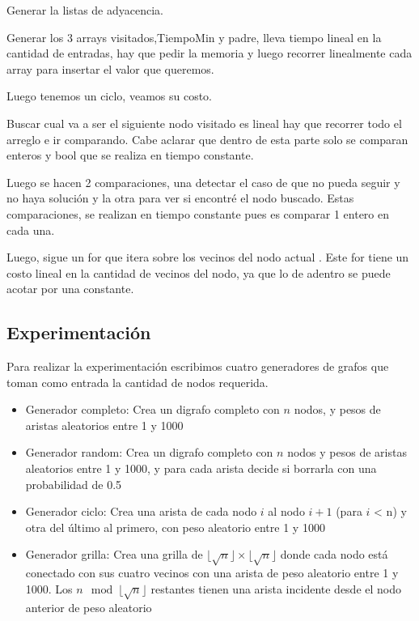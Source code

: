 Generar la listas de adyacencia.

Generar los 3 arrays visitados,TiempoMin y padre, lleva tiempo lineal en la cantidad de entradas, hay que pedir la memoria y luego recorrer linealmente cada array para insertar el valor que queremos.

Luego tenemos un ciclo,  veamos su costo.

Buscar cual va a ser el siguiente nodo visitado es lineal hay que recorrer todo el arreglo e ir comparando. Cabe aclarar que dentro de esta parte solo se comparan enteros y bool que se realiza en tiempo constante.

Luego se hacen 2 comparaciones, una detectar el caso de que no pueda seguir y no haya solución y la otra para ver si encontré el nodo buscado. Estas comparaciones, se realizan en tiempo constante pues es comparar 1 entero en cada una.

Luego,  sigue un for que itera sobre los vecinos del nodo actual . Este for tiene un costo lineal en la cantidad de vecinos del nodo, ya que lo de adentro se puede acotar por una constante.


\subsection{Experimentación}

Para realizar la experimentación escribimos cuatro generadores de grafos que toman como entrada la cantidad de nodos requerida.

\begin{itemize}

    \item Generador completo: Crea un digrafo completo con $n$ nodos, y pesos de aristas aleatorios entre 1 y 1000

    \item Generador random: Crea un digrafo completo con $n$ nodos y pesos de aristas aleatorios entre 1 y 1000, y para cada arista decide si borrarla con una probabilidad de 0.5

    \item Generador ciclo: Crea una arista de cada nodo $i$ al nodo $i+1$ (para $i$ < n) y otra del último al primero, con peso aleatorio entre 1 y 1000

    \item Generador grilla: Crea una grilla de $\lfloor \sqrt{n} \rfloor \times \lfloor \sqrt{n} \rfloor$ donde cada nodo está conectado con sus cuatro vecinos con una arista de peso aleatorio entre 1 y 1000. Los $n \mod \lfloor \sqrt{n} \rfloor$ restantes tienen una arista incidente desde el nodo anterior de peso aleatorio

\end{itemize}

